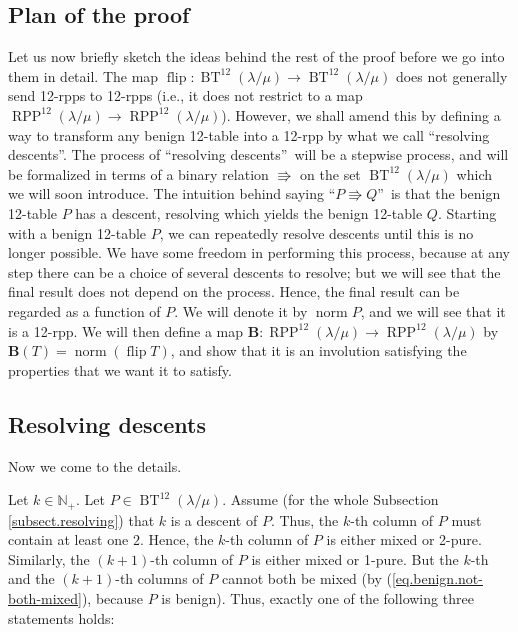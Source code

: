 \documentclass[numbers=enddot,12pt,final,onecolumn,notitlepage]{scrartcl}%
\theoremstyle{definition}
\def\OneTwoRPP{{\operatorname{RPP}^{12}\left(  \lambda/\mu\right)}}
\def\BenignTables{{\operatorname{BT}^{12}\left(  \lambda/\mu\right)}}
\begin{document}
\subsection{Plan of the proof}

Let us now briefly sketch the ideas behind the rest of the proof before we go
into them in detail. The map $\operatorname*{flip}:\BenignTables\rightarrow
\BenignTables$ does not generally send 12-rpps to 12-rpps (i.e., it does not
restrict to a map $\OneTwoRPP\rightarrow\OneTwoRPP$). However, we shall amend
this by defining a way to transform any benign 12-table into a 12-rpp by what
we call \textquotedblleft resolving descents\textquotedblright. The process of
\textquotedblleft resolving descents\textquotedblright\ will be a stepwise
process, and will be formalized in terms of a binary relation $\Rrightarrow$
on the set $\BenignTables$ which we will soon introduce. The intuition behind
saying \textquotedblleft$P\Rrightarrow Q$\textquotedblright\ is that the
benign 12-table $P$ has a descent, resolving which yields the benign 12-table
$Q$. Starting with a benign 12-table $P$, we can repeatedly resolve descents
until this is no longer possible. We have some freedom in
performing this process, because at any step there can be a choice of several
descents to resolve; but we will see that the final result does not depend on
the process. Hence, the final result can be regarded as a function of $P$. We
will denote it by $\operatorname*{norm}P$, and we will see that it is a
12-rpp. We will then define a map $\mathbf{B}:\OneTwoRPP\rightarrow\OneTwoRPP$
by $\mathbf{B}\left(  T\right)  =\operatorname*{norm}\left(
\operatorname*{flip}T\right)  $, and show that it is an involution satisfying
the properties that we want it to satisfy.

\subsection{\label{subsect.resolving}Resolving descents}

Now we come to the details.

Let $k\in\mathbb{N}_{+}$. Let $P\in\BenignTables$. Assume (for the whole Subsection \ref{subsect.resolving}) that $k$
is a descent of $P$. Thus, the $k$-th column of $P$ must contain at least one
$2$. Hence, the $k$-th column of $P$ is either mixed or 2-pure. Similarly, the
$\left(  k+1\right)  $-th column of $P$ is either mixed or 1-pure. But the
$k$-th and the $\left(  k+1\right)  $-th columns of $P$ cannot both be mixed
(by (\ref{eq.benign.not-both-mixed}), because $P$ is benign). Thus,
exactly one of the following three statements holds:
\end{document}
